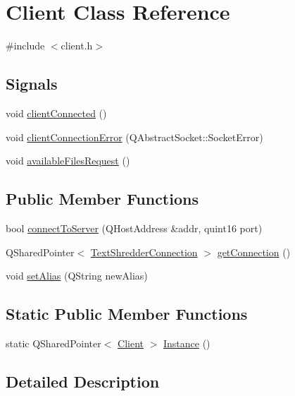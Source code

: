 \hypertarget{class_client}{
\section{Client Class Reference}
\label{class_client}
}


{\ttfamily \#include $<$client.h$>$}

\subsection*{Signals}
\begin{DoxyCompactItemize}
\item 
void \hyperlink{class_client_a9ce3a42731df631923c830cad7fdd3a9}{clientConnected} ()
\item 
void \hyperlink{class_client_a01cb1f3d745c830e77513e56bb30465c}{clientConnectionError} (QAbstractSocket::SocketError)
\item 
void \hyperlink{class_client_a1390021ee4d8190c5372df480e8d3949}{availableFilesRequest} ()
\end{DoxyCompactItemize}
\subsection*{Public Member Functions}
\begin{DoxyCompactItemize}
\item 
bool \hyperlink{class_client_a9ece2ab35718491266ca7d807d1ec963}{connectToServer} (QHostAddress \&addr, quint16 port)
\item 
QSharedPointer$<$ \hyperlink{class_text_shredder_connection}{TextShredderConnection} $>$ \hyperlink{class_client_a9fa7845f7bb959609337128fd01830ba}{getConnection} ()
\item 
void \hyperlink{class_client_a4675bd71963582698fcc2ac0c4bf64f9}{setAlias} (QString newAlias)
\end{DoxyCompactItemize}
\subsection*{Static Public Member Functions}
\begin{DoxyCompactItemize}
\item 
static QSharedPointer$<$ \hyperlink{class_client}{Client} $>$ \hyperlink{class_client_a34475d4f810658aa0c748497eca1b10d}{Instance} ()
\end{DoxyCompactItemize}


\subsection{Detailed Description}


